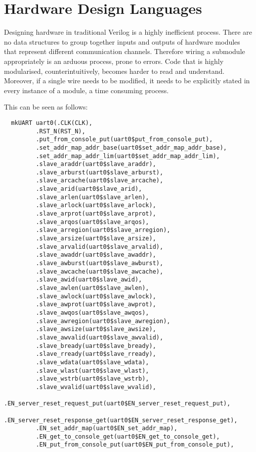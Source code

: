 \documentclass[a4paper,8pt]{report}
\begin{document}
\section{Hardware Design Languages}
Designing hardware in traditional Verilog is a highly inefficient process. There
are no data structures to group together inputs and outputs of hardware modules
that represent different communication channels. Therefore wiring a submodule
appropriately is an arduous process, prone to errors. Code that is highly
modularised, counterintuitively, becomes harder to read and understand.
Moreover, if a single wire needs to be modified, it needs to be explicitly
stated in every instance of a module, a time consuming process.

This can be seen as follows:
\tiny
\begin{verbatim}
  mkUART uart0(.CLK(CLK),
         .RST_N(RST_N),
         .put_from_console_put(uart0$put_from_console_put),
         .set_addr_map_addr_base(uart0$set_addr_map_addr_base),
         .set_addr_map_addr_lim(uart0$set_addr_map_addr_lim),
         .slave_araddr(uart0$slave_araddr),
         .slave_arburst(uart0$slave_arburst),
         .slave_arcache(uart0$slave_arcache),
         .slave_arid(uart0$slave_arid),
         .slave_arlen(uart0$slave_arlen),
         .slave_arlock(uart0$slave_arlock),
         .slave_arprot(uart0$slave_arprot),
         .slave_arqos(uart0$slave_arqos),
         .slave_arregion(uart0$slave_arregion),
         .slave_arsize(uart0$slave_arsize),
         .slave_arvalid(uart0$slave_arvalid),
         .slave_awaddr(uart0$slave_awaddr),
         .slave_awburst(uart0$slave_awburst),
         .slave_awcache(uart0$slave_awcache),
         .slave_awid(uart0$slave_awid),
         .slave_awlen(uart0$slave_awlen),
         .slave_awlock(uart0$slave_awlock),
         .slave_awprot(uart0$slave_awprot),
         .slave_awqos(uart0$slave_awqos),
         .slave_awregion(uart0$slave_awregion),
         .slave_awsize(uart0$slave_awsize),
         .slave_awvalid(uart0$slave_awvalid),
         .slave_bready(uart0$slave_bready),
         .slave_rready(uart0$slave_rready),
         .slave_wdata(uart0$slave_wdata),
         .slave_wlast(uart0$slave_wlast),
         .slave_wstrb(uart0$slave_wstrb),
         .slave_wvalid(uart0$slave_wvalid),
         .EN_server_reset_request_put(uart0$EN_server_reset_request_put),
         .EN_server_reset_response_get(uart0$EN_server_reset_response_get),
         .EN_set_addr_map(uart0$EN_set_addr_map),
         .EN_get_to_console_get(uart0$EN_get_to_console_get),
         .EN_put_from_console_put(uart0$EN_put_from_console_put),

\end{verbatim}
\end{document}
